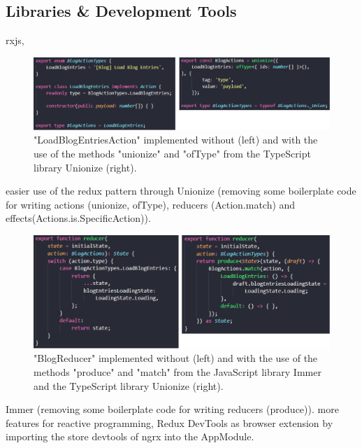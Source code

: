\documentclass[Bachelor,BIF,english]{twbook}
\begin{document}
\subsection{Libraries \& Development Tools}
rxjs,
\\[\baselineskip]
\begin{figure}[!htbp]
\centering
\includegraphics[width=1\linewidth]{PICs/without_and_with_unionize_actions.eps}
\caption{"LoadBlogEntriesAction" implemented without (left) and with the use of the methods "unionize" and "ofType" from the TypeScript library Unionize \cite{Unionize} (right).}\label{Fig4}
\end{figure}
easier use of the redux pattern through Unionize \cite{Unionize} (removing some boilerplate code for writing actions (unionize, ofType), reducers (Action.match) and effects(Actions.is.SpecificAction)).
\\[\baselineskip]
\begin{figure}[!htbp]
\centering
\includegraphics[width=1\linewidth]{PICs/with_and_without_immer_unionize_reducer.eps}
\caption{"BlogReducer" implemented without (left) and with the use of the methods "produce" and "match" from the JavaScript library Immer \cite{Immer} and the TypeScript library Unionize \cite{Unionize} (right).}\label{Fig5}
\end{figure}
Immer \cite{Immer} (removing some boilerplate code for writing reducers (produce)).
more features for reactive programming, Redux DevTools \cite{ReduxDevTools} as browser extension by importing the store devtools of ngrx into the AppModule.
\end{document}
